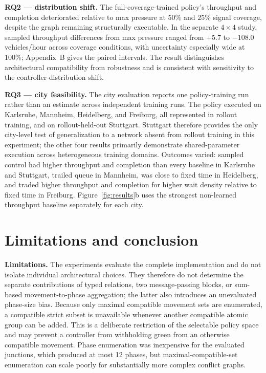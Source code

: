 \documentclass[10pt,a4paper]{article}
\begin{document}
\textbf{RQ2 --- distribution shift.}
The full-coverage-trained policy's throughput and completion deteriorated relative to max pressure at \(50\%\) and \(25\%\) signal coverage, despite the graph remaining structurally executable.
In the separate \(4\times4\) study, sampled throughput differences from max pressure ranged from \(+5.7\) to \(-108.0\) vehicles/hour across coverage conditions, with uncertainty especially wide at \(100\%\); Appendix~B gives the paired intervals.
The result distinguishes architectural compatibility from robustness and is consistent with sensitivity to the controller-distribution shift.

\textbf{RQ3 --- city feasibility.}
The city evaluation reports one policy-training run rather than an estimate across independent training runs.
The policy executed on Karlsruhe, Mannheim, Heidelberg, and Freiburg, all represented in rollout training, and on rollout-held-out Stuttgart.
Stuttgart therefore provides the only city-level test of generalization to a network absent from rollout training in this experiment; the other four results primarily demonstrate shared-parameter execution across heterogeneous training domains.
Outcomes varied: sampled control had higher throughput and completion than every baseline in Karlsruhe and Stuttgart, trailed queue in Mannheim, was close to fixed time in Heidelberg, and traded higher throughput and completion for higher wait density relative to fixed time in Freiburg.
Figure~\ref{fig:results}b uses the strongest non-learned throughput baseline separately for each city.

\section{Limitations and conclusion}

\textbf{Limitations.}
The experiments evaluate the complete implementation and do not isolate individual architectural choices.
They therefore do not determine the separate contributions of typed relations, two message-passing blocks, or sum-based movement-to-phase aggregation; the latter also introduces an unevaluated phase-size bias.
Because only maximal compatible movement sets are enumerated, a compatible strict subset is unavailable whenever another compatible atomic group can be added.
This is a deliberate restriction of the selectable policy space and may prevent a controller from withholding green from an otherwise compatible movement.
Phase enumeration was inexpensive for the evaluated junctions, which produced at most 12 phases, but maximal-compatible-set enumeration can scale poorly for substantially more complex conflict graphs.
\end{document}
